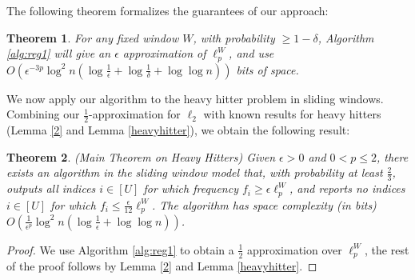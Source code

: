 \documentclass{article}
\theoremstyle{plain}
\newtheorem{theorem}{Theorem}[section]
\begin{document}
The following theorem formalizes the guarantees of our approach:

\begin{theorem}\label{1}
    For any fixed window $W$, with probability $\ge 1 - \delta$, Algorithm \ref{alg:reg1} will give an $\epsilon$ approximation of $\ell_p ^ {W}$, and  use $O(\epsilon ^ {-3p} \log ^ 2n (\log \frac 1{\epsilon} + \log \frac 1{ \delta}+  \log \log n))$ bits of space.
\end{theorem}






We now apply our algorithm to the heavy hitter problem in sliding windows. Combining our $\frac{1}{2}$-approximation for $\ell_2$ with known results for heavy hitters (Lemma \ref{2} and Lemma \ref{heavyhitter}), we obtain the following result:

\begin{theorem}\label{Heavy Hitter}
(Main Theorem on Heavy Hitters)
    Given $\epsilon>0$ and $0<p \leq 2$, there exists an algorithm in the sliding window model that, with probability at least $\frac{2}{3}$, outputs all indices $i \in[U]$ for which frequency $f_i \geq \epsilon \ell_p ^ W$, and reports no indices $i \in[U]$ for which $f_i \leq \frac{\epsilon}{12} \ell_p ^ W$. The algorithm has space complexity (in bits) $O\left(\frac{1}{\epsilon^p} \log ^2 n\left(\log \frac{1}{\epsilon}+\log \log n\right)\right)$.
\end{theorem}

\begin{proof}
We use Algorithm \ref{alg:reg1} to obtain a $\frac 12$ approximation over $\ell_p ^ W$, the rest of the proof follows by Lemma \ref{2} and Lemma \ref{heavyhitter}.

\end{proof}
\end{document}
